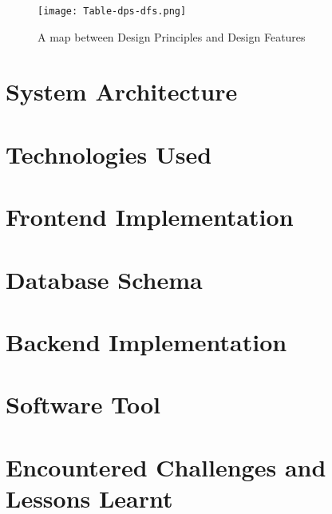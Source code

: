 \begin{figure}[htbp!]
    \centering    
    \texttt{[image: Table-dps-dfs.png]}
    \caption[A map between \ac{dp}s and \ac{df}s]{A map between Design Principles and Design Features}
    \label{fig:implementation:table-dps-dfs}
\end{figure}

\section{System Architecture}
\label{implementation:section:architecture}

\section{Technologies Used}
\label{implementation:section:technologies}

\section{Frontend Implementation}
\label{implementation:section:frontend}

\section{Database Schema}
\label{implementation:section:database}

\section{Backend Implementation}
\label{implementation:section:backend}

\section{Software Tool}
\label{implementation:section:tool}

\section{Encountered Challenges and Lessons Learnt}
\label{implementation:section:challenges}
